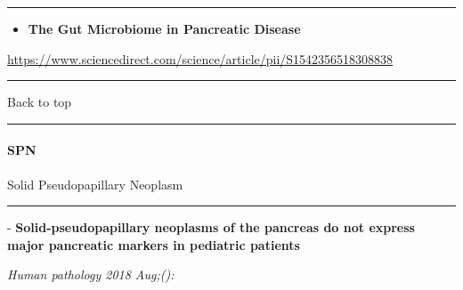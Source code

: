 \documentclass[]{article}
\providecommand{\tightlist}{%
  \setlength{\itemsep}{0pt}\setlength{\parskip}{0pt}}
\let\oldparagraph\paragraph
\renewcommand{\paragraph}[1]{\oldparagraph{#1}\mbox{}}
\begin{document}
\begin{center}\rule{0.5\linewidth}{\linethickness}\end{center}

\begin{itemize}
\tightlist
\item
  \textbf{The Gut Microbiome in Pancreatic Disease}
\end{itemize}

\url{https://www.sciencedirect.com/science/article/pii/S1542356518308838}

\begin{center}\rule{0.5\linewidth}{\linethickness}\end{center}

Back to top

\begin{center}\rule{0.5\linewidth}{\linethickness}\end{center}

\pagebreak

\hypertarget{spn}{%
\paragraph{SPN}\label{spn}}

Solid Pseudopapillary Neoplasm

\begin{center}\rule{0.5\linewidth}{\linethickness}\end{center}

 - \textbf{Solid-pseudopapillary neoplasms of the pancreas do not
express major pancreatic markers in pediatric patients}

\emph{Human pathology 2018 Aug;():}
\end{document}
